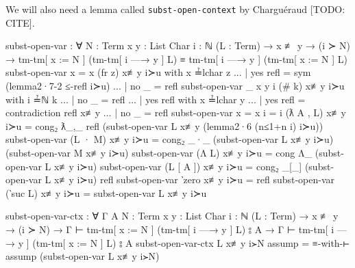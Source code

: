 \documentclass[logo,bsc,singlespacing,parskip,online]{infthesis}
\renewenvironment{code}{\mintedcopy[breaklines,breaksymbolleft=\;]{agda}}{\endmintedcopy}
\begin{document}
We will also need a lemma called \texttt{subst-open-context}
by Charguéraud [TODO: CITE].

\begin{code}
  subst-open-var : ∀ {N : Term} {x y : List Char} {i : ℕ}
    (L : Term)
    → x ≢ y
    → (i ≻ N)
    → tm-tm[ x := N ] (tm-tm[ i —→ y ] L)
      ≡ tm-tm[ i —→ y ] (tm-tm[ x := N ] L)
  subst-open-var {x = x} (fr z) x≢y i≻u with x ≟lchar z
  ... | yes refl = sym (lemma2·7-2 ≤-refl i≻u)
  ... | no  _    = refl
  subst-open-var {_} {x} {y} {i} (# k) x≢y i≻u with i ≟ℕ k
  ... | no  _ = refl
  ... | yes refl with x ≟lchar y
  ...    | yes refl = contradiction refl x≢y
  ...    | no  _    = refl
  subst-open-var {x = x} {i = i} (ƛ A , L) x≢y i≻u
    = cong₂ ƛ_,_
      refl
      (subst-open-var L x≢y (lemma2·6 (n≤1+n i) i≻u))
  subst-open-var (L · M) x≢y i≻u = cong₂ _·_
    (subst-open-var L x≢y i≻u) (subst-open-var M x≢y i≻u)
  subst-open-var (Λ L) x≢y i≻u =
    cong Λ_ (subst-open-var L x≢y i≻u)
  subst-open-var (L [ A ]) x≢y i≻u =
    cong₂ _[_] (subst-open-var L x≢y i≻u) refl
  subst-open-var ‵zero x≢y i≻u = refl
  subst-open-var (‵suc L) x≢y i≻u = subst-open-var L x≢y i≻u

  subst-open-var-ctx : ∀ {Γ A} {N : Term} {x y : List Char} {i : ℕ}
    (L : Term)
    → x ≢ y
    → (i ≻ N)
    → Γ ⊢ tm-tm[ x := N ] (tm-tm[ i —→ y ] L) ⦂ A
    → Γ ⊢ tm-tm[ i —→ y ] (tm-tm[ x := N ] L) ⦂ A
  subst-open-var-ctx L x≢y i≻N assump =
    ≡-with-⊢ assump (subst-open-var L x≢y i≻N)
\end{code}
\end{document}

